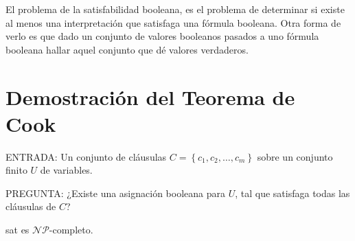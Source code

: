 \documentclass[a4paper, spanish, utf8]{memoir}
\begin{document}
El problema de la satisfabilidad booleana, es el problema de determinar si
existe al menos una interpretación que satisfaga una fórmula booleana. Otra forma de verlo es que dado un conjunto de valores booleanos pasados a uno fórmula booleana
hallar aquel conjunto que dé valores verdaderos.

\section{Demostración del Teorema de Cook}


\noindent ENTRADA: Un conjunto de cláusulas $C=\left \{c_1, c_2, \dots, c_m \right \}$ sobre un conjunto finito $U$ de variables.

\noindent PREGUNTA: ¿Existe una asignación booleana para $U$, tal que satisfaga todas las cláusulas de $C$?


\begin{thm}
  \gls{sat} es $\mathcal{NP}$-completo.
\end{thm}
\end{document}
